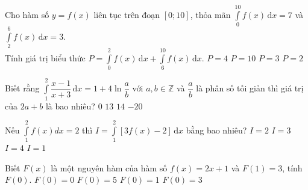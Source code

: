 \begin{ex}%
	Cho hàm số $y=f(x)$ liên tục trên đoạn $[0;10]$, thỏa mãn $\displaystyle\int\limits_0^{10} f(x)\mathrm{\,d}x=7$ và $\displaystyle\int\limits_2^6 f(x)\mathrm{\,d}x=3$.\\
	Tính giá trị biểu thức $P=\displaystyle\int\limits_0^2 f(x)\mathrm{\,d}x+\displaystyle\int\limits_6^{10} f(x)\mathrm{\,d}x$. 
	\choice
	{\True $P=4$}
	{$P=10$}
	{$P=3$}
	{$P=2$}
\end{ex}

\begin{ex}%
	Biết rằng $\displaystyle\int\limits_1^2\dfrac{x-1}{x+3}\mathrm{\,d}x=1+4\ln\dfrac{a}{b}$ với $a,b\in\mathbb{Z}$ và $\dfrac{a}{b}$ là phân số tối giản thì giá trị của $2a+b$ là bao nhiêu?
	\choice
	{$0$}
	{\True $13$}
	{$14$}
	{$-20$}
\end{ex}

\begin{ex}%
	Nếu $\displaystyle\int\limits_1^2 f(x)d x=2$ thì $I=\displaystyle\int\limits_1^2[3f(x)-2]\mathrm{\,d}x$ bằng bao nhiêu?
	\choice
	{$I=2$}
	{$I=3$}
	{\True $I=4$}
	{$I=1$}
\end{ex}

\begin{ex}%
	Biết $F(x)$ là một nguyên hàm của hàm số $f(x)=2x+1$ và $F(1)=3$, tính $F(0)$. 
	\choice
	{$F(0)=0$}
	{$F(0)=5$}
	{\True $F(0)=1$}
	{$F(0)=3$}
\end{ex}

